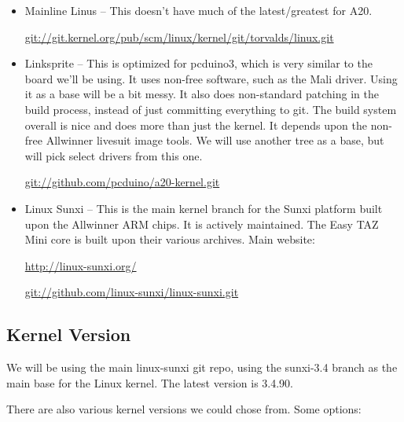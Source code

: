 \begin{itemize}
  \item{Mainline Linus -- This doesn't have much of the latest/greatest for A20.

  \url{git://git.kernel.org/pub/scm/linux/kernel/git/torvalds/linux.git}}

  \item{Linksprite -- This is optimized for pcduino3, which is very similar to the
  board we'll be using. It uses non-free software, such as the Mali driver.
  Using it as a base will be a bit messy. It also does non-standard patching
  in the build process, instead of just committing everything to git. The
  build system overall is nice and does more than just the kernel. It depends
  upon the non-free Allwinner livesuit image tools. We will use another tree
  as a base, but will pick select drivers from this one.

  \url{git://github.com/pcduino/a20-kernel.git}}

  \item{Linux Sunxi -- This is the main kernel branch for the Sunxi platform built
  upon the Allwinner ARM chips. It is actively maintained. The Easy TAZ Mini
  core is built upon their various archives. Main website:

  \url{http://linux-sunxi.org/}

  \url{git://github.com/linux-sunxi/linux-sunxi.git}}

\end{itemize}



\subsection{Kernel Version}

We will be using the main linux-sunxi git repo, using the sunxi-3.4 branch as
the main base for the Linux kernel. The latest version is 3.4.90.

There are also various kernel versions we could chose from. Some options:

